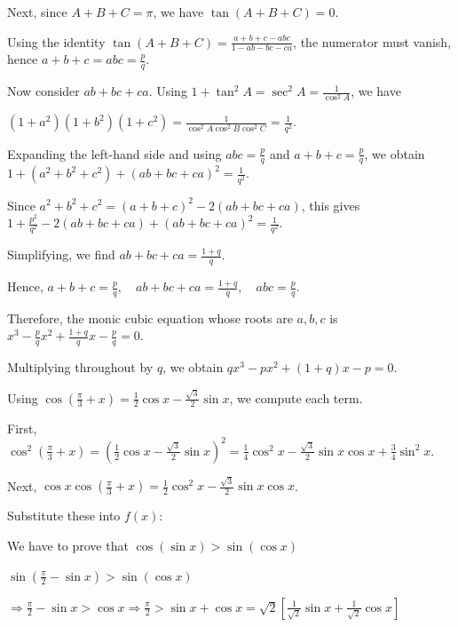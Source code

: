   Next, since $A+B+C=\pi$, we have $\tan(A+B+C)=0$.

  Using the identity $\tan(A+B+C) =\frac{a+b+c - abc}{1 - ab- bc - ca}$,
  the numerator must vanish, hence
  $a+b+c = abc =\frac{p}{q}$.

  Now consider $ab + bc + ca$. Using $1+\tan^2A=\sec^2A=\frac1{\cos^2A}$,
  we have

  $(1+a^2)(1+b^2)(1+c^2) = \frac1{\cos^2A\cos^2B\cos^2C} = \frac1{q^2}$.

  Expanding the left-hand side and using $abc=\frac{p}{q}$ and $a + b + c=\frac{p}{q}$, we obtain
  $1+(a^2+b^2+c^2)+(ab+bc+ca)^2=\frac1{q^2}$.

  Since $a^2+b^2+c^2=(a + b + c)^2 - 2(ab + bc + ca)$, this gives
  $1+\frac{p^2}{q^2}-2(ab + bc + ca) + (ab + bc + ca)^2 = \frac1{q^2}$.

  Simplifying, we find $ab + bc + ca=\frac{1+q}{q}$.

  Hence, $a + b + c = \frac{p}{q},\quad
  ab + bc + ca = \frac{1+q}{q},\quad
  abc = \frac{p}{q}$.

  Therefore, the monic cubic equation whose roots are $a, b, c$ is
  $x^3-\frac{p}{q}x^2+\frac{1+q}{q}x-\frac{p}{q}=0$.

  Multiplying throughout by $q$, we obtain
  $qx^3-px^2+(1+q)x-p=0$.
\item Using $\cos\!\left(\frac\pi3+x\right) = \frac12\cos x-\frac{\sqrt3}{2}\sin x$,
  we compute each term.

  First, $\cos^2\!\left(\frac\pi3+x\right) = \left(\frac12\cos x-\frac{\sqrt3}{2}\sin x\right)^2
  =\frac14\cos^2 x-\frac{\sqrt3}{2}\sin x\cos x+\frac34\sin^2 x$.

  Next, $\cos x\cos\!\left(\frac\pi3+x\right) = \frac12\cos^2 x-\frac{\sqrt3}{2}\sin x\cos x$.

  Substitute these into $f(x)$:
  \startformula
  \stopformula
\item We have to prove that $\cos(\sin x) > \sin(\cos x)$

  $\sin\left(\frac{\pi}{2} - \sin x\right) > \sin(\cos x)$

  $\Rightarrow \frac{\pi}{2} - \sin x > \cos x \Rightarrow \frac{\pi}{2} > \sin x + \cos x
  = \sqrt{2}\left[\frac{1}{\sqrt{2}}\sin x + \frac{1}{\sqrt{2}}\cos x\right]$

